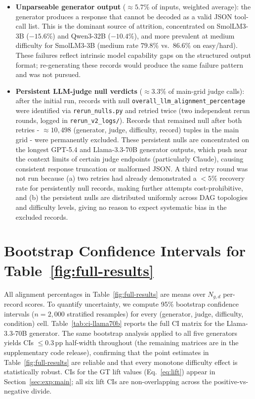 \begin{itemize}
  \item \textbf{Unparseable generator output} (${\approx}5.7\%$ of inputs, weighted average): the generator produces a response that cannot be decoded as a valid JSON tool-call list. This is the dominant source of attrition, concentrated on SmolLM3-3B ($-15.6\%$) and Qwen3-32B ($-10.4\%$), and more prevalent at medium difficulty for SmolLM3-3B (medium rate $79.8\%$ vs.\ $86.6\%$ on easy/hard). These failures reflect intrinsic model capability gaps on the structured output format; re-generating these records would produce the same failure pattern and was not pursued.
  \item \textbf{Persistent LLM-judge null verdicts} (${\approx}3.3\%$ of main-grid judge calls): after the initial run, records with null \texttt{overall\_llm\_alignment\_percentage} were identified via \texttt{rerun\_nulls.py} and retried twice (two independent rerun rounds, logged in \texttt{rerun\_v2\_logs/}). Records that remained null after both retries - ${\approx}10{,}498$ (generator, judge, difficulty, record) tuples in the main grid - were permanently excluded. These persistent nulls are concentrated on the longest GPT-5.4 and Llama-3.3-70B generator outputs, which push near the context limits of certain judge endpoints (particularly Claude), causing consistent response truncation or malformed JSON. A third retry round was not run because (a) two retries had already demonstrated a ${<}5\%$ recovery rate for persistently null records, making further attempts cost-prohibitive, and (b) the persistent nulls are distributed uniformly across DAG topologies and difficulty levels, giving no reason to expect systematic bias in the excluded records.
\end{itemize}

\section{Bootstrap Confidence Intervals for Table~\ref{fig:full-results}}
\label{app:bootstrap-ci}

All alignment percentages in Table~\ref{fig:full-results} are means over $N_{g,d}$ per-record scores. To quantify uncertainty, we compute 95\% bootstrap confidence intervals ($n{=}2{,}000$ stratified resamples) for every (generator, judge, difficulty, condition) cell. Table~\ref{tab:ci-llama70b} reports the full CI matrix for the Llama-3.3-70B generator. The same bootstrap analysis applied to all five generators yields CIs $\leq 0.3$\,pp half-width throughout (the remaining matrices are in the supplementary code release), confirming that the point estimates in Table~\ref{fig:full-results} are reliable and that every monotone difficulty effect is statistically robust. CIs for the GT lift values (Eq.~\ref{eq:lift}) appear in Section~\ref{sec:exp:main}; all six lift CIs are non-overlapping across the positive-vs-negative divide.

